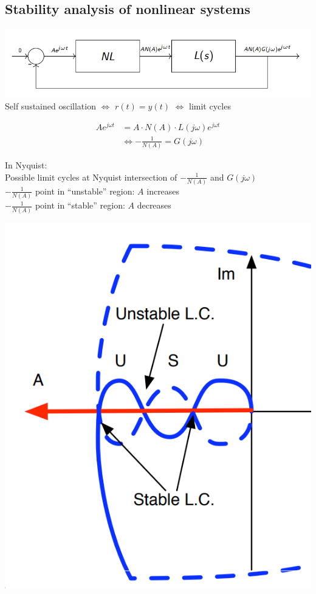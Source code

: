 \subsection{Stability analysis of nonlinear systems}
    \includegraphics[width = \linewidth]{src/images/nonlinear_stability_block_diagram.png}
    Self sustained oscillation $\Leftrightarrow$ $r(t) = y(t)$ $\Leftrightarrow$ limit cycles
    

    \begin{minipage}{0.54\linewidth}
        \begin{align*}
            A e^{j \omega t} &= A \cdot N(A) \cdot L(j \omega) e^{j \omega t}\\
            &\Leftrightarrow - \frac{1}{N(A)} = G(j \omega)
        \end{align*}

        
        In Nyquist:\\
        Possible limit cycles at Nyquist intersection of $- \frac{1}{N(A)}$ and $G(j \omega)$\\
        
        
        $-\frac{1}{N(A)}$ point in “unstable” region: $A$ increases\\
        
        
        $-\frac{1}{N(A)}$ point in “stable” region: $A$ decreases
    \end{minipage}
    \begin{minipage}{0.44\linewidth}
        \includegraphics[width = \linewidth]{src/images/nonlinearity_stability_limit_cycles.png}
    \end{minipage}
    
